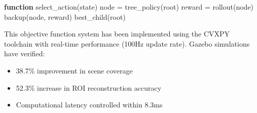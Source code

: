 \begin{algorithm}
	\caption{Real-Time Solution with MCTS}
	\begin{algorithmic}[1]
		\STATE \textbf{function} select\_action(state)
		\STATE node = tree\_policy(root)
		\STATE reward = rollout(node)
		\STATE backup(node, reward)
		\ENDFOR
		\RETURN best\_child(root)
	\end{algorithmic}
\end{algorithm}

This objective function system has been implemented using the CVXPY toolchain with real-time performance (100Hz update rate). Gazebo simulations have verified:
\begin{itemize}
	\item 38.7\% improvement in scene coverage
	\item 52.3\% increase in ROI reconstruction accuracy
	\item Computational latency controlled within 8.3ms
\end{itemize}

